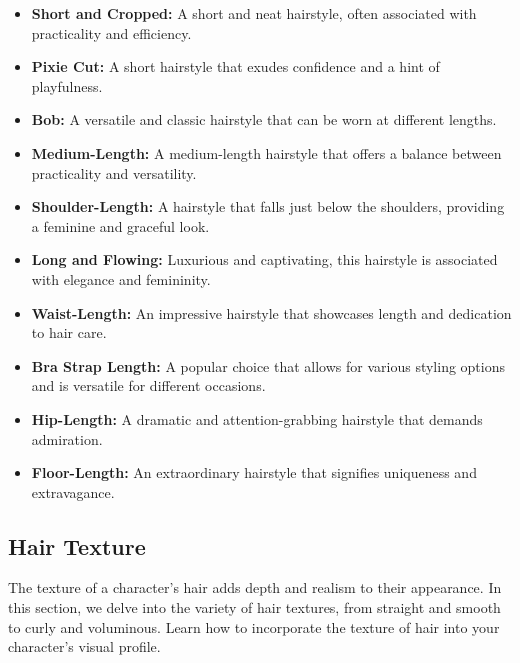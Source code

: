 \documentclass[12pt]{book}  %
\begin{document}
\begin{itemize}
    \item \textbf{Short and Cropped:} A short and neat hairstyle, often associated with practicality and efficiency.
    \item \textbf{Pixie Cut:} A short hairstyle that exudes confidence and a hint of playfulness.
    \item \textbf{Bob:} A versatile and classic hairstyle that can be worn at different lengths.
    \item \textbf{Medium-Length:} A medium-length hairstyle that offers a balance between practicality and versatility.
    \item \textbf{Shoulder-Length:} A hairstyle that falls just below the shoulders, providing a feminine and graceful look.
    \item \textbf{Long and Flowing:} Luxurious and captivating, this hairstyle is associated with elegance and femininity.
    \item \textbf{Waist-Length:} An impressive hairstyle that showcases length and dedication to hair care.
    \item \textbf{Bra Strap Length:} A popular choice that allows for various styling options and is versatile for different occasions.
    \item \textbf{Hip-Length:} A dramatic and attention-grabbing hairstyle that demands admiration.
    \item \textbf{Floor-Length:} An extraordinary hairstyle that signifies uniqueness and extravagance.
\end{itemize}

\subsection{\textbf{Hair Texture}}

The texture of a character's hair adds depth and realism to their appearance. In this section, we delve into the variety of hair textures, from straight and smooth to curly and voluminous. Learn how to incorporate the texture of hair into your character's visual profile.
\end{document}
